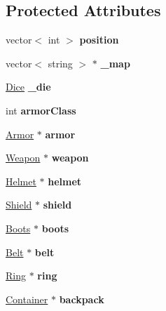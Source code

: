 \subsection*{Protected Attributes}
\begin{DoxyCompactItemize}
\item 
\hypertarget{class_characters_a4a257d97e159dc2a0045a24996155314}{}\label{class_characters_a4a257d97e159dc2a0045a24996155314} 
vector$<$ int $>$ {\bfseries position}
\item 
\hypertarget{class_characters_a1da634bd68441445cc53f920f59c6a4b}{}\label{class_characters_a1da634bd68441445cc53f920f59c6a4b} 
vector$<$ string $>$ $\ast$ {\bfseries \+\_\+map}
\item 
\hypertarget{class_characters_af86008aff2fe089a3d2fb1a0577a8337}{}\label{class_characters_af86008aff2fe089a3d2fb1a0577a8337} 
\hyperlink{class_dice}{Dice} {\bfseries \+\_\+die}
\item 
\hypertarget{class_characters_a6b25e6b617c51e3ffae2cbb4e164dbe6}{}\label{class_characters_a6b25e6b617c51e3ffae2cbb4e164dbe6} 
int {\bfseries armor\+Class}
\item 
\hypertarget{class_characters_a57e35013d914968e76639ec4dfd67da0}{}\label{class_characters_a57e35013d914968e76639ec4dfd67da0} 
\hyperlink{class_armor}{Armor} $\ast$ {\bfseries armor}
\item 
\hypertarget{class_characters_add8192820b7e7c0b99a65c126134124a}{}\label{class_characters_add8192820b7e7c0b99a65c126134124a} 
\hyperlink{class_weapon}{Weapon} $\ast$ {\bfseries weapon}
\item 
\hypertarget{class_characters_a48d5c58db983ce2f8a4f5dce62f7db2a}{}\label{class_characters_a48d5c58db983ce2f8a4f5dce62f7db2a} 
\hyperlink{class_helmet}{Helmet} $\ast$ {\bfseries helmet}
\item 
\hypertarget{class_characters_a3267107151073593a7ecd0017c277f36}{}\label{class_characters_a3267107151073593a7ecd0017c277f36} 
\hyperlink{class_shield}{Shield} $\ast$ {\bfseries shield}
\item 
\hypertarget{class_characters_abe3abefeac045002ac6b777f3f7878d0}{}\label{class_characters_abe3abefeac045002ac6b777f3f7878d0} 
\hyperlink{class_boots}{Boots} $\ast$ {\bfseries boots}
\item 
\hypertarget{class_characters_a19ed25f4db397055e69ec6a48a6a29a4}{}\label{class_characters_a19ed25f4db397055e69ec6a48a6a29a4} 
\hyperlink{class_belt}{Belt} $\ast$ {\bfseries belt}
\item 
\hypertarget{class_characters_a63fc2f1ee2a9489dbf85ea61ec076d3e}{}\label{class_characters_a63fc2f1ee2a9489dbf85ea61ec076d3e} 
\hyperlink{class_ring}{Ring} $\ast$ {\bfseries ring}
\item 
\hypertarget{class_characters_adf846a705a8a0641248e601c87c25403}{}\label{class_characters_adf846a705a8a0641248e601c87c25403} 
\hyperlink{class_container}{Container} $\ast$ {\bfseries backpack}
\end{DoxyCompactItemize}



